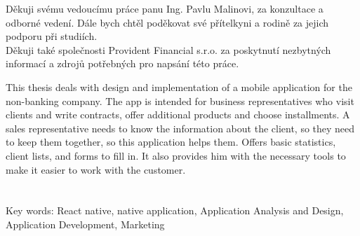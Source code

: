 \documentclass[11pt,twoside,a4paper]{book}
\begin{document}
	
	\translate				%

	{
	 \cleardoublepage \thispagestyle{empty}
	

	
	\newpage
	}

	\coverpagestarts


	\acknowledgements
	\noindent
	Děkuji svému vedoucímu práce panu Ing. Pavlu Malinovi, za konzultace
	a odborné vedení. Dále bych chtěl poděkovat své přítelkyni a rodině za jejich podporu
	při studiích.\\
	\noindent 
	Děkuji také společnosti Provident Financial s.r.o. za poskytnutí nezbytných informací a zdrojů potřebných pro napsání této práce.





 
	\abstractpage

	This thesis deals with design and implementation of a mobile application for the non-banking company. The app is intended for business representatives who visit clients and write contracts, offer additional products and choose installments. A sales representative needs to know the information about the client, so they need to keep them together, so this application helps them. Offers basic statistics, client lists, and forms to fill in. It also provides him with the necessary tools to make it easier to work with the customer.\\
\\\\
	Key words: React native, native application, Application Analysis and Design, Application Development, Marketing
\end{document}
